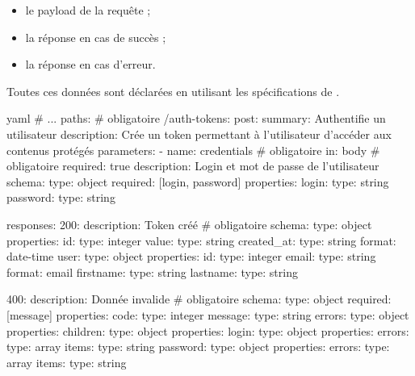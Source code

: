 \documentclass[big]{zmdocument}
\begin{document}
\begin{itemize}
\item le payload de la requête ;
\item la réponse en cas de succès ;
\item la réponse en cas d'erreur.
\end{itemize}


Toutes ces données sont déclarées en utilisant les spécifications de .



\begin{CodeBlock}{yaml}
# ...
paths: # obligatoire
  /auth-tokens:
    post:
      summary: Authentifie un utilisateur
      description: Crée un token permettant à l'utilisateur d'accéder aux contenus protégés
      parameters:
        - name: credentials  # obligatoire
          in: body  # obligatoire
          required: true
          description: Login et mot de passe de l'utilisateur
          schema:
            type: object
            required: [login, password]
            properties:
              login: 
                type: string
              password:
                type: string
            
            
      responses:
        200:
          description: Token créé  # obligatoire
          schema:
            type: object
            properties:
              id:
                type: integer
              value:
                type: string
              created_at:
                type: string
                format: date-time
              user:
                type: object
                properties:
                  id:
                    type: integer
                  email:
                    type: string
                    format: email
                  firstname:
                    type: string
                  lastname:
                    type: string
      
        400:
          description: Donnée invalide  # obligatoire
          schema:
            type: object
            required: [message]
            properties:
              code:
                type: integer
              message:
                type: string
              errors:
                type: object
                properties:
                  children:
                    type: object
                    properties:
                      login:
                        type: object
                        properties:
                          errors:
                            type: array
                            items:
                              type: string
                      password:
                        type: object
                        properties:
                          errors:
                            type: array
                            items:
                              type: string  
\end{CodeBlock}
\end{document}
